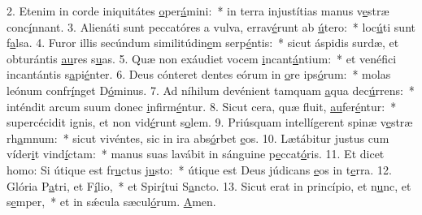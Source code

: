 2. Etenim in corde iniquitátes \uline{o}per\uline{á}mini:~* in terra injustítias manus v\uline{e}stræ conc\uline{í}nnant.
3. Alienáti sunt peccatóres a vulva, errav\uline{é}runt ab \uline{ú}tero:~* loc\uline{ú}ti sunt f\uline{a}lsa.
4. Furor illis secúndum similitúdin\uline{e}m serp\uline{é}ntis:~* sicut áspidis surdæ, et obturántis \uline{au}res s\uline{u}as.
5. Quæ non exáudiet vocem \uline{i}ncant\uline{á}ntium:~* et venéfici incantántis s\uline{a}pi\uline{é}nter.
6. Deus cónteret dentes eórum in \uline{o}re ips\uline{ó}rum:~* molas leónum confr\uline{í}nget D\uline{ó}minus.
7. Ad níhilum devénient tamquam \uline{a}qua dec\uline{ú}rrens:~* inténdit arcum suum donec \uline{i}nfirm\uline{é}ntur.
8. Sicut cera, quæ fluit, \uline{au}fer\uline{é}ntur:~* supercécidit ignis, et non vid\uline{é}runt s\uline{o}lem.
9. Priúsquam intellígerent spinæ v\uline{e}stræ rh\uline{a}mnum:~* sicut vivéntes, sic in ira abs\uline{ó}rbet \uline{e}os.
10. Lætábitur justus cum víder\uline{i}t vind\uline{í}ctam:~* manus suas lavábit in sánguine p\uline{e}ccat\uline{ó}ris.
11. Et dicet homo: Si útique est fr\uline{u}ctus j\uline{u}sto:~* útique est Deus júdicans \uline{e}os in t\uline{e}rra.
12. Glória P\uline{a}tri, et F\uline{í}lio,~* et Spir\uline{í}tui S\uline{a}ncto.
13. Sicut erat in princípio, et n\uline{u}nc, et s\uline{e}mper,~* et in sǽcula sæcul\uline{ó}rum. \uline{A}men.
